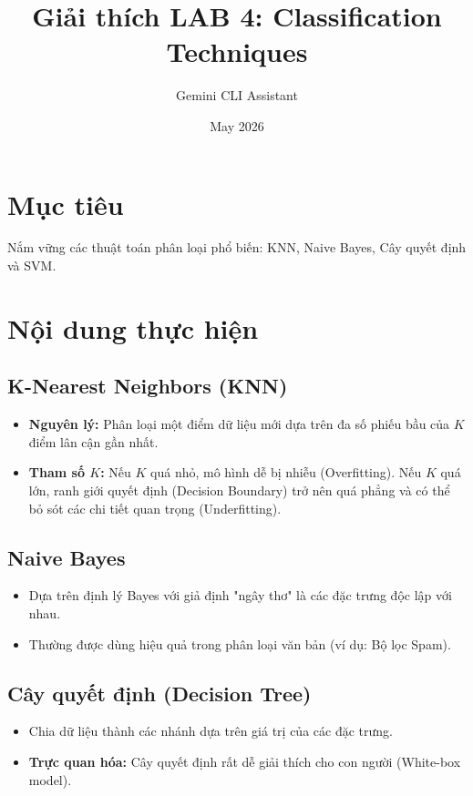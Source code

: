\documentclass{article}
\title{Giải thích LAB 4: Classification Techniques}
\author{Gemini CLI Assistant}
\date{May 2026}
\begin{document}
\maketitle

\section{Mục tiêu}
Nắm vững các thuật toán phân loại phổ biến: KNN, Naive Bayes, Cây quyết định và SVM.

\section{Nội dung thực hiện}

\subsection{K-Nearest Neighbors (KNN)}
\begin{itemize}
    \item \textbf{Nguyên lý:} Phân loại một điểm dữ liệu mới dựa trên đa số phiếu bầu của $K$ điểm lân cận gần nhất.
    \item \textbf{Tham số $K$:} Nếu $K$ quá nhỏ, mô hình dễ bị nhiễu (Overfitting). Nếu $K$ quá lớn, ranh giới quyết định (Decision Boundary) trở nên quá phẳng và có thể bỏ sót các chi tiết quan trọng (Underfitting).
\end{itemize}

\subsection{Naive Bayes}
\begin{itemize}
    \item Dựa trên định lý Bayes với giả định "ngây thơ" là các đặc trưng độc lập với nhau.
    \item Thường được dùng hiệu quả trong phân loại văn bản (ví dụ: Bộ lọc Spam).
\end{itemize}

\subsection{Cây quyết định (Decision Tree)}
\begin{itemize}
    \item Chia dữ liệu thành các nhánh dựa trên giá trị của các đặc trưng.
    \item \textbf{Trực quan hóa:} Cây quyết định rất dễ giải thích cho con người (White-box model).
\end{itemize}
\end{document}
